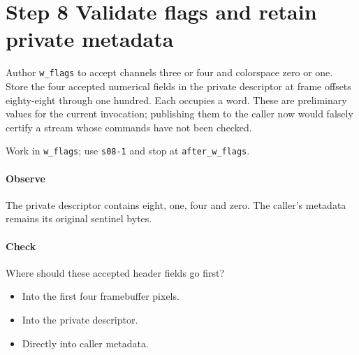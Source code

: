 \section{Step 8 Validate flags and retain private metadata}\label{qoi-s08}
Author \texttt{w\_flags} to accept channels three or four and colorspace zero or one. Store the four accepted numerical fields in the private descriptor at frame offsets eighty-eight through one hundred. Each occupies a word. These are preliminary values for the current invocation; publishing them to the caller now would falsely certify a stream whose commands have not been checked.

Work in \texttt{w\_flags}; use \texttt{s08-1} and stop at \texttt{after\_w\_flags}.

\paragraph{Observe} The private descriptor contains eight, one, four and zero. The caller’s metadata remains its original sentinel bytes.

\paragraph{Check} Where should these accepted header fields go first?
\begin{itemize}
  \item[A.] Into the first four framebuffer pixels.
  \item[B.] Into the private descriptor.
  \item[C.] Directly into caller metadata.
\end{itemize}

